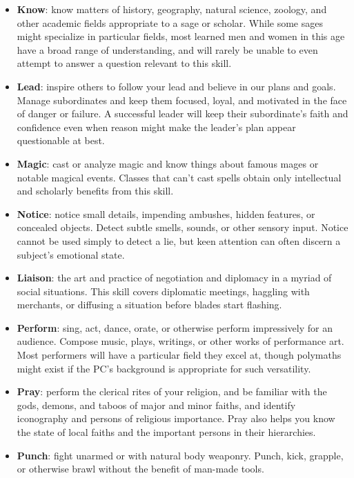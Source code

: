\documentclass[itdr/core]{subfiles}
\begin{document}
\begin{itemize}
\item \textbf{Know}: know matters of history, geography, natural science, zoology, and other academic fields appropriate to a sage or scholar. While some sages might specialize in particular fields, most learned men and women in this age have a broad range of understanding, and will rarely be unable to even attempt to answer a question relevant to this skill.

\item \textbf{Lead}: inspire others to follow your lead and believe in our plans and goals. Manage subordinates and keep them focused, loyal, and motivated in the face of danger or failure. A successful leader will keep their subordinate’s faith and confidence even when reason might make the leader’s plan appear questionable at best.

\item \textbf{Magic}: cast or analyze magic and know things about famous mages or notable magical events. Classes that can’t cast spells obtain only intellectual and scholarly benefits from this skill.

\item \textbf{Notice}: notice small details, impending ambushes, hidden features, or concealed objects. Detect subtle smells, sounds, or other sensory input. Notice cannot be used simply to detect a lie, but keen attention can often discern a subject’s emotional state.

\item \textbf{Liaison}: the art and practice of negotiation and diplomacy in a myriad of social situations. This skill covers diplomatic meetings, haggling with merchants, or diffusing a situation before blades start flashing.

\item \textbf{Perform}: sing, act, dance, orate, or otherwise perform impressively for an audience. Compose music, plays, writings, or other works of performance art. Most performers will have a particular field they excel at, though polymaths might exist if the PC’s background is appropriate for such versatility.

\item \textbf{Pray}: perform the clerical rites of your religion, and be familiar with the gods, demons, and taboos of major and minor faiths, and identify iconography and persons of religious importance. Pray also helps you know the state of local faiths and the important persons in their hierarchies.

\item \textbf{Punch}: fight unarmed or with natural body weaponry. Punch, kick, grapple, or otherwise brawl without the benefit of man-made tools.


\end{itemize}
\end{document}
